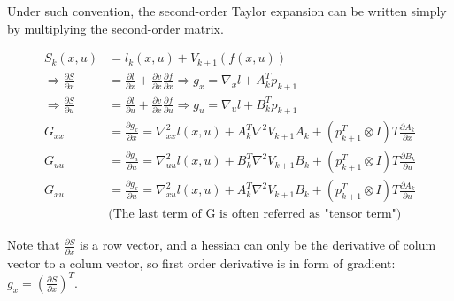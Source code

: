 Under such convention, the second-order Taylor expansion can be written simply by multiplying the second-order matrix.

\begin{equation}
    \begin{aligned}     S_k(x,u) & = l_k(x,u) + V_{k+1}(f(x,u)) \\     \Rightarrow \frac{\partial S}{\partial x} & = \frac{\partial l}{\partial x} + \frac{\partial v}{\partial x} \frac{\partial f}{\partial x} \Rightarrow g_x = \nabla_x l + A_k^T p_{k+1} \\     \Rightarrow \frac{\partial S}{\partial u} & = \frac{\partial l}{\partial u} + \frac{\partial v}{\partial x} \frac{\partial f}{\partial u} \Rightarrow g_u = \nabla_u l + B_k^T p_{k+1} \\     G_{xx} & = \frac{\partial g_x}{\partial x} = \nabla_{xx}^2 l(x,u) + A_k^T \nabla^2 V_{k+1} A_k + (p_{k+1}^T \otimes I) T \frac{\partial A_k}{\partial x} \\     G_{uu} & = \frac{\partial g_u}{\partial u} = \nabla_{uu}^2 l(x,u) + B_k^T \nabla^2 V_{k+1} B_k + (p_{k+1}^T \otimes I) T \frac{\partial B_k}{\partial u} \\     G_{xu} & = \frac{\partial g_x}{\partial u} = \nabla_{xu}^2 l(x,u) + A_k^T \nabla^2 V_{k+1} B_k + (p_{k+1}^T \otimes I) T \frac{\partial A_k}{\partial u} \\     & \text{(The last term of $$G$$ is often referred as "tensor term")} \end{aligned}
\end{equation}

Note that $\frac{\partial S}{\partial x}$ is a row vector, and a hessian can only be the derivative of colum vector to a colum vector, so first order derivative is in form of gradient: $g_x = \left(\frac{\partial S}{\partial x}\right)^T$.